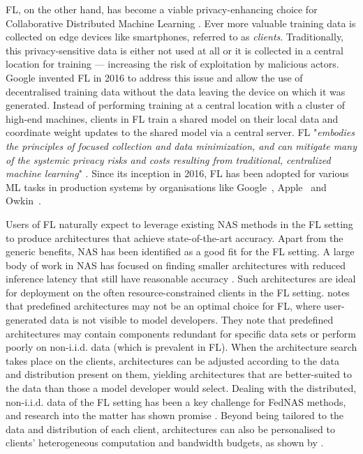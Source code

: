 FL, on the other hand, has become a viable privacy-enhancing choice for Collaborative Distributed Machine Learning \cite{cdml_2024}. Ever more valuable training data is collected on edge devices like smartphones, referred to as \textit{clients}. Traditionally, this privacy-sensitive data is either not used at all or it is collected in a central location for training — increasing the risk of exploitation by malicious actors. Google invented FL in 2016 to address this issue and allow the use of decentralised training data without the data leaving the device on which it was generated. Instead of performing training at a central location with a cluster of high-end machines, clients in FL train a shared model on their local data and coordinate weight updates to the shared model via a central server. FL "\textit{embodies the principles of focused collection and data minimization, and can mitigate many of the systemic privacy risks and costs resulting from traditional, centralized machine learning}" \cite{fl_advances_and_open_problems_2021}. Since its inception in 2016, FL has been adopted for various ML tasks in production systems by organisations like Google~\cite{gboard_fl_2018}, Apple~\cite{apple_fl_case_study_2025} and Owkin~\cite{owkin_fl_drug_discovery_in_prod_2022}.

Users of FL naturally expect to leverage existing NAS methods in the FL setting to produce architectures that achieve state-of-the-art accuracy. Apart from the generic benefits, NAS has been identified as a good fit for the FL setting. A large body of work in NAS has focused on finding smaller architectures with reduced inference latency that still have reasonable accuracy \cite{nas_1000_papers_2023}. Such architectures are ideal for deployment on the often resource-constrained clients in the FL setting. \cite{fl_advances_and_open_problems_2021} notes that predefined architectures may not be an optimal choice for FL, where user-generated data is not visible to model developers. They note that predefined architectures may contain components redundant for specific data sets or perform poorly on non-i.i.d. data (which is prevalent in FL). When the architecture search takes place on the clients, architectures can be adjusted according to the data and distribution present on them, yielding architectures that are better-suited to the data than those a model developer would select. Dealing with the distributed, non-i.i.d. data of the FL setting has been a key challenge for FedNAS methods, and research into the matter has shown promise \cite{fednas_2021} \cite{rl_fednas_2021} \cite{fedoras_2022} \cite{finch_2024} \cite{peaches_2024}. Beyond being tailored to the data and distribution of each client, architectures can also be personalised to clients' heterogeneous computation and bandwidth budgets, as shown by \cite{superfednas_2024} \cite{fedoras_2022} \cite{perfedrlnas_2024} \cite{decnas_2022}. 

